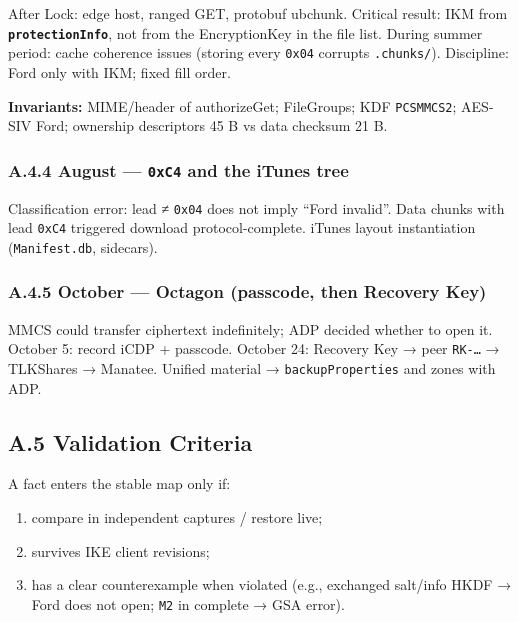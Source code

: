 \documentclass[
  english,
  10pt]{article}
\providecommand{\tightlist}{%
  \setlength{\itemsep}{0pt}\setlength{\parskip}{0pt}}
\begin{document}
After Lock: edge host, ranged GET, protobuf ubchunk. Critical result:
IKM from \textbf{\texttt{protectionInfo}}, not from the EncryptionKey in
the file list. During summer period: cache coherence issues (storing
every \texttt{0x04} corrupts \texttt{.chunks/}). Discipline: Ford only
with IKM; fixed fill order.

\textbf{Invariants:} MIME/header of authorizeGet; FileGroups; KDF
\texttt{PCSMMCS2}; AES-SIV Ford; ownership descriptors 45 B vs data
checksum 21 B.

\subsubsection{\texorpdfstring{A.4.4 August --- \texttt{0xC4} and the
iTunes
tree}{A.4.4 August --- 0xC4 and the iTunes tree}}\label{a.4.4-august-0xc4-and-the-itunes-tree}

Classification error: lead ≠ \texttt{0x04} does not imply ``Ford
invalid''. Data chunks with lead \texttt{0xC4} triggered download
protocol-complete. iTunes layout instantiation (\texttt{Manifest.db},
sidecars).

\subsubsection{A.4.5 October --- Octagon (passcode, then Recovery
Key)}\label{a.4.5-october-octagon-passcode-then-recovery-key}

MMCS could transfer ciphertext indefinitely; ADP decided whether to open
it. October 5: record iCDP + passcode. October 24: Recovery Key → peer
\texttt{RK-…} → TLKShares → Manatee. Unified material →
\texttt{backupProperties} and zones with ADP.

\subsection{A.5 Validation Criteria}\label{a.5-validation-criteria}

A fact enters the stable map only if:

\begin{enumerate}
\def\labelenumi{\arabic{enumi}.}
\tightlist
\item
  compare in independent captures / restore live;
\item
  survives IKE client revisions;
\item
  has a clear counterexample when violated (e.g., exchanged salt/info
  HKDF → Ford does not open; \texttt{M2} in complete → GSA error).
\end{enumerate}
\end{document}
